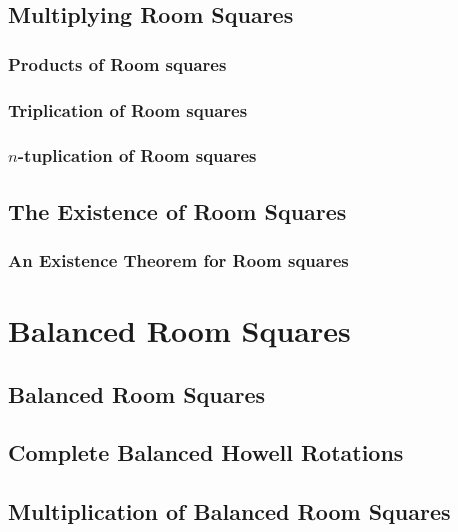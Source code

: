 \documentclass[a4paper, draft]{book}
\begin{document}
\chapter{Multiplying Room Squares}
  \label{ch:multiplication-theorem}
  \section{Products of Room squares}
    \label{sec:multiplication-theorem}
    
  \section{Triplication of Room squares}
    \label{sec:triplication}
    
  \section{$n$-tuplication of Room squares}
    \label{sec:n-tuplication}
    

\chapter{The Existence of Room Squares}
  \label{ch:existence-theorem}
  \section{An Existence Theorem for Room squares}
    \label{sec:existence-theorem}
    

\part{Balanced Room Squares}

\chapter{Balanced Room Squares}
  \label{ch:balanced-room-squares}
  

\chapter{Complete Balanced Howell Rotations}
  \label{ch:cbhr}
  
  

\chapter{Multiplication of Balanced Room Squares}
  \label{ch:brs-multiplication}
  
\end{document}
